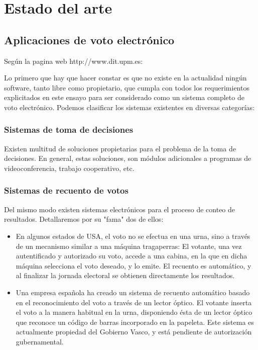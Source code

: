 \section{Estado del arte}

\subsection{Aplicaciones de voto electrónico}
Según la pagina web http://www.dit.upm.es:

Lo primero que hay que hacer constar es que no existe en la actualidad ningún software, tanto libre como propietario, que cumpla con todos los requerimientos explicitados en este ensayo para ser considerado como un sistema completo de voto electrónico. Podemos clasificar los sistemas existentes en diversas categorías:

\subsubsection{Sistemas de toma de decisiones}
Existen multitud de soluciones propietarias para el problema de la toma de decisiones. En general, estas soluciones, son módulos adicionales a programas de videoconferencia, trabajo cooperativo, etc.

\subsubsection{Sistemas de recuento de votos}
Del mismo modo existen sistemas electrónicos para el proceso de conteo de resultados. Detallaremos por su "fama" dos de ellos:

\begin{itemize}
\item En algunos estados de USA, el voto no se efectua en una urna, sino a través de un mecanismo similar a una máquina tragaperras: El votante, una vez autentificado y autorizado su voto, accede a una cabina, en la que en dicha máquina selecciona el voto deseado, y lo emite. El recuento es automático, y al finalizar la jornada electoral se obtienen directamente los resultados.
\item Una empresa española ha creado un sistema de recuento automático basado en el reconocimiento del voto a través de un lector óptico. El votante inserta el voto a la manera habitual en la urna, disponiendo ésta de un lector óptico que reconoce un código de barras incorporado en la papeleta. Este sistema es actualmente propiedad del Gobierno Vasco, y está pendiente de autorización gubernamental.

\end{itemize}

